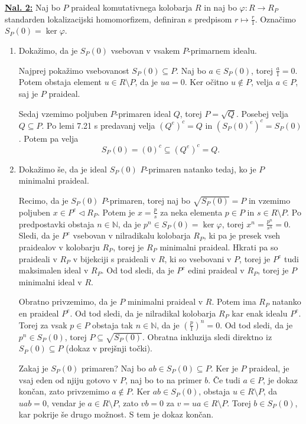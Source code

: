 \documentclass[a4paper, 12pt]{article}
\newcommand{\N}{\mathbb{N}}
\newcommand{\subideal}{\vartriangleleft}
\begin{document}
\underline{\textbf{Nal. 2:}}
Naj bo $P$ praideal komutativnega kolobarja $R$ in naj bo $\varphi\colon R \to R_P$ standarden lokalizacijski homomorfizem, definiran s predpisom $r \mapsto \frac{r}{1}$. Označimo $S_P(0) = \ker \varphi$.
\begin{enumerate}[label=(\alph*)]
	\item Dokažimo, da je $S_P(0)$ vsebovan v vsakem $P$-primarnem idealu.
	
	Najprej pokažimo vsebovanost $S_P(0) \subseteq P$. Naj bo $a \in S_P(0)$, torej $\frac{a}{1} = 0$. Potem obstaja element $u \in R\setminus P$, da je $ua = 0.$ Ker očitno $u \notin P$, velja $a \in P$, saj je $P$ praideal.
	
	Sedaj vzemimo poljuben $P$-primaren ideal $Q$, torej $P = \sqrt{Q}$. Posebej velja $Q \subseteq P$. Po lemi 7.21 s predavanj velja $(Q^e)^c = Q$ in $(S_P(0)^e)^c = S_P(0)$. Potem pa velja
	\[
	S_P(0) = (0)^c \subseteq (Q^e)^c = Q.
	\]
	\item Dokažimo še, da je ideal $S_P(0)$ $P$-primaren natanko tedaj, ko je $P$ minimalni praideal.
	
	Recimo, da je $S_P(0)$ $P$-primaren, torej naj bo $\sqrt{S_P(0)} = P$ in vzemimo poljuben $x \in P^e \subideal R_P$. Potem je $x = \frac{p}{s}$ za neka elementa $p \in P$ in $s \in R\setminus P$. Po predpostavki obstaja $n \in \N$, da je $p^n \in S_P(0) = \ker\varphi$, torej $x^n = \frac{p^n}{s^n} = 0$. Sledi, da je $P^e$ vsebovan v nilradikalu kolobarja $R_P$, ki pa je presek vseh praidealov v kolobarju $R_P$, torej je $R_P$ minimalni praideal. Hkrati pa so praideali v $R_P$ v bijekciji s praideali v $R$, ki so vsebovani v $P$, torej je $P^e$ tudi maksimalen ideal v $R_P$. Od tod sledi, da je $P^e$ edini praideal v $R_P$, torej je $P$ minimalni ideal v $R$.
	
	Obratno privzemimo, da je $P$ minimalni praideal v $R$. Potem ima $R_P$ natanko en praideal $P^e$. Od tod sledi, da je nilradikal kolobarja $R_P$ kar enak idealu $P^e$. Torej za vsak $p\in P$ obstaja tak $n\in\N$, da je $\left(\frac{p}{1}\right)^n = 0$. Od tod sledi, da je $p^n \in S_P(0)$, torej $P \subseteq \sqrt{S_P(0)}$. Obratna inkluzija sledi direktno iz $S_P(0) \subseteq P$ (dokaz v prejšnji točki).
	
	Zakaj je $S_P(0)$ primaren? Naj bo $ab \in S_P(0) \subseteq P$. Ker je $P$ praideal, je vsaj eden od njiju gotovo v $P$, naj bo to na primer $b$. Če tudi $a \in P$, je dokaz končan, zato privzemimo $a \notin P$. Ker $ab \in S_P(0)$, obstaja $u \in R\setminus P$, da $uab = 0$, vendar je $a \in R\setminus P$, zato $vb = 0$ za $v = ua \in R\setminus P$. Torej $b \in S_P(0)$, kar pokrije še drugo možnost. S tem je dokaz končan. 
	

\end{enumerate}
\end{document}
